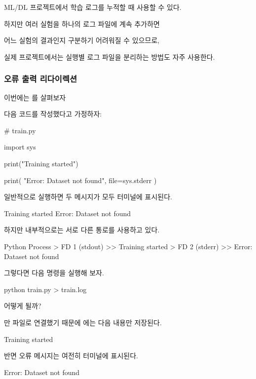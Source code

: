 ML/DL 프로젝트에서 학습 로그를 누적할 때 사용할 수 있다.

하지만 여러 실험을 하나의 로그 파일에 계속 추가하면 

어느 실험의 결과인지 구분하기 어려워질 수 있으므로, 

실제 프로젝트에서는 실행별 로그 파일을 분리하는 방법도 자주 사용한다.

\subsubsection{오류 출력 리다이렉션 }

이번에는 를 살펴보자

다음 코드를 작성했다고 가정하자:

\begin{dhkcode}
# train.py

import sys

print("Training started")

print(
    "Error: Dataset not found",
    file=sys.stderr
)
\end{dhkcode}

일반적으로 실행하면 두 메시지가 모두 터미널에 표시된다.

\begin{dhkzsh}
Training started
Error: Dataset not found
\end{dhkzsh}

하지만 내부적으로는 서로 다른 통로를 사용하고 있다.

\begin{dhkdir}
Python Process
> FD 1 (stdout)
>> Training started
> FD 2 (stderr)
>> Error: Dataset not found
\end{dhkdir}

그렇다면 다음 명령을 실행해 보자.

\begin{dhkzsh}
python train.py > train.log
\end{dhkzsh}

어떻게 될까?

만 파일로 연결했기 때문에 에는 다음 내용만 저장된다.

\begin{dhkzsh}
Training started
\end{dhkzsh}

반면 오류 메시지는 여전히 터미널에 표시된다.

\begin{dhkzsh}
Error: Dataset not found
\end{dhkzsh}

